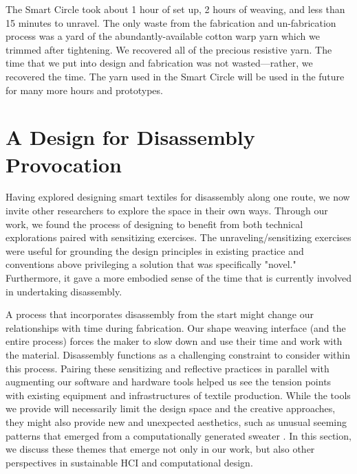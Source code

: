 The Smart Circle took about 1 hour of set up, 2 hours of weaving, and less than 15 minutes to unravel. The only waste from the fabrication and un-fabrication process was a yard of the abundantly-available cotton warp yarn which we trimmed after tightening. We recovered all of the precious resistive yarn. The time that we put into design and fabrication was not wasted---rather, we recovered the time. The yarn used in the Smart Circle will be used in the future for many more hours and prototypes.

\section{A Design for Disassembly Provocation}

Having explored designing smart textiles for disassembly along one route, we now invite other researchers to explore the space in their own ways. Through our work, we found the process of designing to benefit from both technical explorations paired with sensitizing exercises. The unraveling/sensitizing exercises were useful for grounding the design principles in existing practice and conventions above privileging a solution that was specifically "novel." Furthermore, it gave a more embodied sense of the time that is currently involved in undertaking disassembly.

A process that incorporates disassembly from the start might change our relationships with time during fabrication. Our shape weaving interface (and the entire process) forces the maker to slow down and use their time and work with the material. Disassembly functions as a challenging constraint to consider within this process. %
Pairing these sensitizing and reflective practices in parallel with augmenting our software and hardware tools helped us see the tension points with existing equipment and infrastructures of textile production. %
While the tools we provide will necessarily limit the design space and the creative approaches, they might also provide new and unexpected aesthetics, such as unusual seeming patterns that emerged from a computationally generated sweater \cite{beta_brand_brown}. In this section, we discuss these themes that emerge not only in our work, but also other perspectives in sustainable HCI and computational design.

